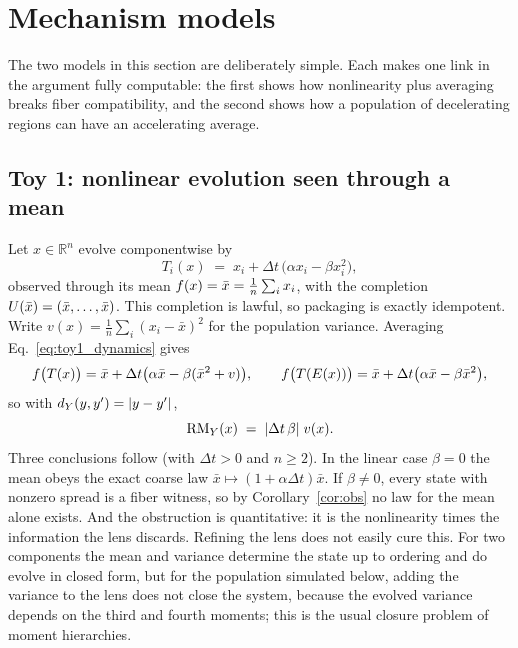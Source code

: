 \documentclass[11pt]{article}
\theoremstyle{plain}
\theoremstyle{definition}
\theoremstyle{remark}
\newcommand{\RMobs}{\RM_{\ObsSpace}}
\begin{document}
\section{Mechanism models}\label{sec:mech}

The two models in this section are deliberately simple. Each makes one link in the argument fully computable: the first shows how nonlinearity plus averaging breaks fiber compatibility, and the second shows how a population of decelerating regions can have an accelerating average.

\subsection{Toy 1: nonlinear evolution seen through a mean}\label{sec:mech:toy1}

Let $x\in\mathbb{R}^n$ evolve componentwise by
\begin{equation}
T_i(x) \;=\; x_i+\Delta t\,\big(\alpha x_i-\beta x_i^2\big),
\label{eq:toy1_dynamics}
\end{equation}
observed through its mean $f(x)=\bar x=\tfrac1n\sum_i x_i$, with the completion $U(\bar x)=(\bar x,\dots,\bar x)$. This completion is lawful, so packaging is exactly idempotent. Write $v(x)=\tfrac1n\sum_i(x_i-\bar x)^2$ for the population variance. Averaging Eq.~\eqref{eq:toy1_dynamics} gives
\begin{equation}
f\big(T(x)\big)=\bar x+\Delta t\big(\alpha\bar x-\beta(\bar x^2+v)\big),\qquad
f\big(T(E(x))\big)=\bar x+\Delta t\big(\alpha\bar x-\beta\bar x^2\big),
\end{equation}
so with $d_{Y}(y,y')=|y-y'|$,
\begin{equation}
\RMobs(x) \;=\; |\Delta t\,\beta|\;v(x).
\label{eq:toy1_identity}
\end{equation}
Three conclusions follow (with $\Delta t>0$ and $n\ge2$). In the linear case $\beta=0$ the mean obeys the exact coarse law $\bar x\mapsto(1+\alpha\Delta t)\bar x$. If $\beta\neq0$, every state with nonzero spread is a fiber witness, so by Corollary~\ref{cor:obs} no law for the mean alone exists. And the obstruction is quantitative: it is the nonlinearity times the information the lens discards. Refining the lens does not easily cure this. For two components the mean and variance determine the state up to ordering and do evolve in closed form, but for the population simulated below, adding the variance to the lens does not close the system, because the evolved variance depends on the third and fourth moments; this is the usual closure problem of moment hierarchies.
\end{document}
